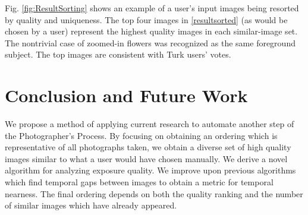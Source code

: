 \documentclass{article}
\begin{document}


Fig. \ref{fig:ResultSorting} shows an example of a user's input images being resorted by quality and uniqueness. The top four images in \ref{resultsorted} (as would be chosen by a user) represent the highest quality images in each similar-image set. The nontrivial case of zoomed-in flowers was recognized as the same foreground subject. The top images are consistent with Turk users' votes.


\section{Conclusion and Future Work}
We propose a method of applying current research to automate another step of the Photographer's Process. By focusing on obtaining an ordering which is representative of all photographs taken, we obtain a diverse set of high quality images similar to what a user would have chosen manually. We derive a novel algorithm for analyzing exposure quality. We improve upon previous algorithms which find temporal gaps between images to obtain a metric for temporal nearness. The final ordering depends on both the quality ranking and the number of similar images which have already appeared.
\end{document}
